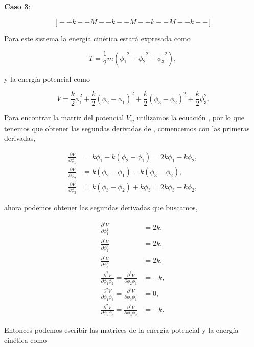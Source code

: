 \documentclass[a4paper,10pt]{article}
\numberwithin{equation}{section}
\begin{document}
\vspace{.3cm}

\textbf{Caso 3}:

$$
] - - k - - M - - k - - M - - k - - M - - k - -[
$$

Para este sistema la energía cinética estará expresada como

\begin{equation}
 T = \frac{1}{2}m(\dot{\phi_1}^2 + \dot{\phi_2}^2 + \dot{\phi_3}^2),
\end{equation}

y la energía potencial como

\begin{equation}
 V = \frac{k}{2}\phi_1^2 + \frac{k}{2}(\phi_2 - \phi_1)^2 + \frac{k}{2}(\phi_3 - \phi_2)^2
 + \frac{k}{2}\phi_3^2.
 \label{eq:energpoten4}
\end{equation}

Para encontrar la matriz del potencial $V_{ij}$ utilizamos la ecuación ,
por lo que tenemos que obtener las segundas derivadas de , comencemos 
con las primeras derivadas,

\begin{align*}
 \frac{\partial V}{\partial \phi_1} &= k\phi_1 - k (\phi_2 - \phi_1) = 2k\phi_1 - k\phi_2, \\
 \frac{\partial V}{\partial \phi_2} &= k (\phi_2 - \phi_1) - k (\phi_3 - \phi_2), \\
 \frac{\partial V}{\partial \phi_3} &= k (\phi_3 - \phi_2) + k\phi_3 = 2k\phi_3 - k\phi_2,
\end{align*}

ahora podemos obtener las segundas derivadas que buscamos,

\begin{align*}
 \frac{\partial^2 V}{\partial \phi_1^2} &= 2k, \\
 \frac{\partial^2 V}{\partial \phi_2^2} &= 2k, \\
 \frac{\partial^2 V}{\partial \phi_3^2} &= 2k, \\
 \frac{\partial^2 V}{\partial \phi_1\phi_2} = \frac{\partial^2 V}{\partial \phi_2\phi_1}&= -k, \\
 \frac{\partial^2 V}{\partial \phi_1\phi_3} = \frac{\partial^2 V}{\partial \phi_3\phi_1}  &= 0, \\
 \frac{\partial^2 V}{\partial \phi_2\phi_3} =  \frac{\partial^2 V}{\partial \phi_3\phi_2} &= -k.
\end{align*}

Entonces podemos escribir las matrices de la energía potencial y la energía 
cinética como
\end{document}
